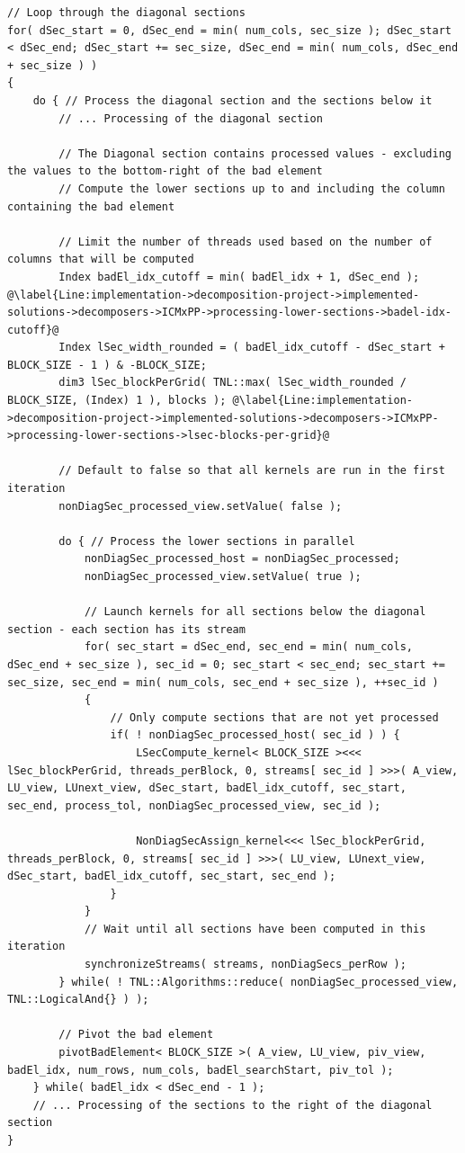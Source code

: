 \begin{lstlisting}
// Loop through the diagonal sections
for( dSec_start = 0, dSec_end = min( num_cols, sec_size ); dSec_start < dSec_end; dSec_start += sec_size, dSec_end = min( num_cols, dSec_end + sec_size ) )
{	
	do { // Process the diagonal section and the sections below it
		// ... Processing of the diagonal section
		
		// The Diagonal section contains processed values - excluding the values to the bottom-right of the bad element
		// Compute the lower sections up to and including the column containing the bad element
		
		// Limit the number of threads used based on the number of columns that will be computed
		Index badEl_idx_cutoff = min( badEl_idx + 1, dSec_end ); @\label{Line:implementation->decomposition-project->implemented-solutions->decomposers->ICMxPP->processing-lower-sections->badel-idx-cutoff}@
		Index lSec_width_rounded = ( badEl_idx_cutoff - dSec_start + BLOCK_SIZE - 1 ) & -BLOCK_SIZE;
		dim3 lSec_blockPerGrid( TNL::max( lSec_width_rounded / BLOCK_SIZE, (Index) 1 ), blocks ); @\label{Line:implementation->decomposition-project->implemented-solutions->decomposers->ICMxPP->processing-lower-sections->lsec-blocks-per-grid}@
		
		// Default to false so that all kernels are run in the first iteration
		nonDiagSec_processed_view.setValue( false );
		
		do { // Process the lower sections in parallel
			nonDiagSec_processed_host = nonDiagSec_processed;
			nonDiagSec_processed_view.setValue( true );
			
			// Launch kernels for all sections below the diagonal section - each section has its stream
			for( sec_start = dSec_end, sec_end = min( num_cols, dSec_end + sec_size ), sec_id = 0; sec_start < sec_end; sec_start += sec_size, sec_end = min( num_cols, sec_end + sec_size ), ++sec_id )
			{
				// Only compute sections that are not yet processed
				if( ! nonDiagSec_processed_host( sec_id ) ) {
					LSecCompute_kernel< BLOCK_SIZE ><<< lSec_blockPerGrid, threads_perBlock, 0, streams[ sec_id ] >>>( A_view, LU_view, LUnext_view, dSec_start, badEl_idx_cutoff, sec_start, sec_end, process_tol, nonDiagSec_processed_view, sec_id );
					
					NonDiagSecAssign_kernel<<< lSec_blockPerGrid, threads_perBlock, 0, streams[ sec_id ] >>>( LU_view, LUnext_view, dSec_start, badEl_idx_cutoff, sec_start, sec_end );
				}
			}
			// Wait until all sections have been computed in this iteration
			synchronizeStreams( streams, nonDiagSecs_perRow );
		} while( ! TNL::Algorithms::reduce( nonDiagSec_processed_view, TNL::LogicalAnd{} ) );
		
		// Pivot the bad element
		pivotBadElement< BLOCK_SIZE >( A_view, LU_view, piv_view, badEl_idx, num_rows, num_cols, badEl_searchStart, piv_tol );
	} while( badEl_idx < dSec_end - 1 );
	// ... Processing of the sections to the right of the diagonal section
}
\end{lstlisting}

